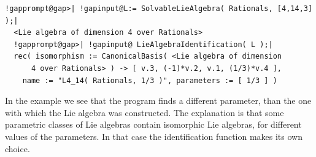\documentclass[a4paper,11pt]{report}
\begin{document}
{{{\begin{Verbatim}[commandchars=!@|,fontsize=\small,frame=single,label=Example]
  !gapprompt@gap>| !gapinput@L:= SolvableLieAlgebra( Rationals, [4,14,3] );|
  <Lie algebra of dimension 4 over Rationals>
  !gapprompt@gap>| !gapinput@ LieAlgebraIdentification( L );|
  rec( isomorphism := CanonicalBasis( <Lie algebra of dimension 
      4 over Rationals> ) -> [ v.3, (-1)*v.2, v.1, (1/3)*v.4 ], 
    name := "L4_14( Rationals, 1/3 )", parameters := [ 1/3 ] )
\end{Verbatim}
 In the example we see that the program finds a different parameter, than the
one with which the Lie algebra was constructed. The explanation is that some
parametric classes of Lie algebras contain isomorphic Lie algebras, for
different values of the parameters. In that case the identification function
makes its own choice. }

 }

 }

 
\end{document}
